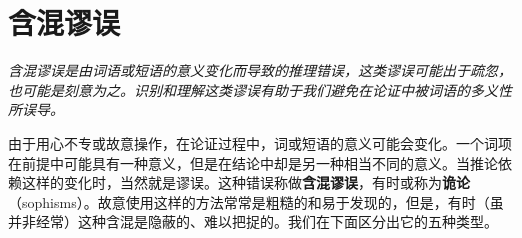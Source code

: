 \section{含混谬误}

\begin{logicbox}[title=引言]
\textit{含混谬误是由词语或短语的意义变化而导致的推理错误，这类谬误可能出于疏忽，也可能是刻意为之。识别和理解这类谬误有助于我们避免在论证中被词语的多义性所误导。}
\end{logicbox}

由于用心不专或故意操作，在论证过程中，词或短语的意义可能会变化。一个词项在前提中可能具有一种意义，但是在结论中却是另一种相当不同的意义。当推论依赖这样的变化时，当然就是谬误。这种错误称做\textbf{含混谬误}，有时或称为\textbf{诡论}（sophisms）。故意使用这样的方法常常是粗糙的和易于发现的，但是，有时（虽并非经常）这种含混是隐蔽的、难以把捉的。我们在下面区分出它的五种类型。 
